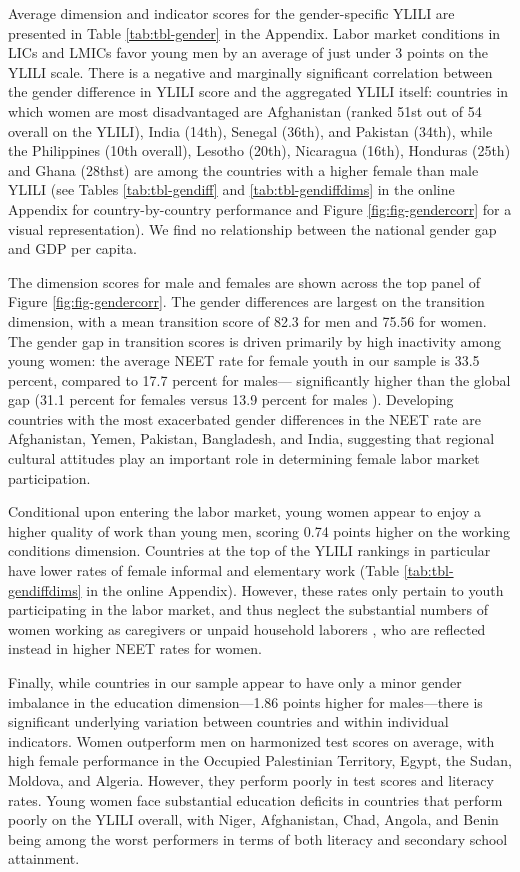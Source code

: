 \documentclass[
  a4paper, twoside, 12pt]{book}
\begin{document}
Average dimension and indicator scores for the gender-specific YLILI are presented in Table \ref{tab:tbl-gender} in the Appendix. Labor market conditions in LICs and LMICs favor young men by an average of just under 3 points on the YLILI scale. There is a negative and marginally significant correlation between the gender difference in YLILI score and the aggregated YLILI itself: countries in which women are most disadvantaged are Afghanistan (ranked 51st out of 54 overall on the YLILI), India (14th), Senegal (36th), and Pakistan (34th), while the Philippines (10th overall), Lesotho (20th), Nicaragua (16th), Honduras (25th) and Ghana (28thst) are among the countries with a higher female than male YLILI (see Tables \ref{tab:tbl-gendiff} and \ref{tab:tbl-gendiffdims} in the online Appendix for country-by-country performance and Figure \ref{fig:fig-gendercorr} for a visual representation). We find no relationship between the national gender gap and GDP per capita.

The dimension scores for male and females are shown across the top panel of Figure \ref{fig:fig-gendercorr}. The gender differences are largest on the transition dimension, with a mean transition score of 82.3 for men and 75.56 for women. The gender gap in transition scores is driven primarily by high inactivity among young women: the average NEET rate for female youth in our sample is 33.5 percent, compared to 17.7 percent for males--- significantly higher than the global gap (31.1 percent for females versus 13.9 percent for males \autocite{ilo2020}). Developing countries with the most exacerbated gender differences in the NEET rate are Afghanistan, Yemen, Pakistan, Bangladesh, and India, suggesting that regional cultural attitudes play an important role in determining female labor market participation.

Conditional upon entering the labor market, young women appear to enjoy a higher quality of work than young men, scoring 0.74 points higher on the working conditions dimension. Countries at the top of the YLILI rankings in particular have lower rates of female informal and elementary work (Table \ref{tab:tbl-gendiffdims} in the online Appendix). However, these rates only pertain to youth participating in the labor market, and thus neglect the substantial numbers of women working as caregivers or unpaid household laborers \autocite{ilo2020}, who are reflected instead in higher NEET rates for women.

Finally, while countries in our sample appear to have only a minor gender imbalance in the education dimension---1.86 points higher for males---there is significant underlying variation between countries and within individual indicators. Women outperform men on harmonized test scores on average, with high female performance in the Occupied Palestinian Territory, Egypt, the Sudan, Moldova, and Algeria. However, they perform poorly in test scores and literacy rates. Young women face substantial education deficits in countries that perform poorly on the YLILI overall, with Niger, Afghanistan, Chad, Angola, and Benin being among the worst performers in terms of both literacy and secondary school attainment.
\end{document}
